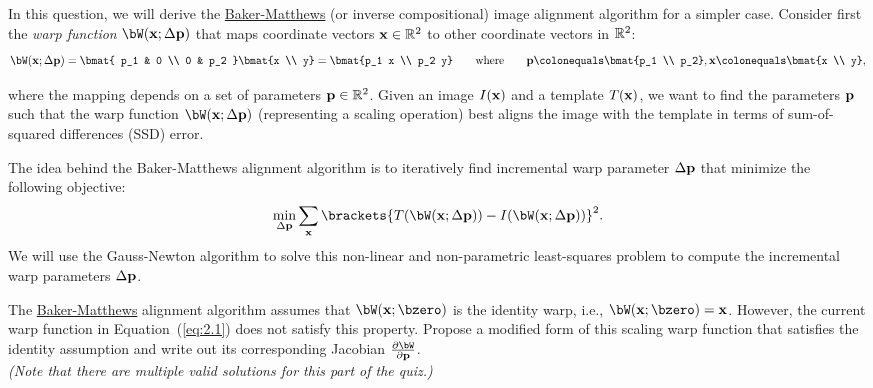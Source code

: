 \begin{problem}
  In this question, we will derive the \underline{Baker-Matthews}
  (or inverse compositional) image alignment algorithm for a simpler case.
  Consider first the \emph{warp function} $\bW(\bx; \Delta \bp)$ that maps
  coordinate vectors $\mathbf{x} \in \mathbb{R}^2$ to other coordinate vectors in $\mathbb{R}^2$:
  \begin{equation}
    \bW(\bx; \Delta \bp) =
      \bmat{ p_1 & 0 \\ 0 & p_2 }
      \bmat{x \\ y}
      = \bmat{p_1 x \\ p_2 y}
      \qquad \text{where} \qquad
      \bp \colonequals \bmat{p_1 \\ p_2},
      \bx \colonequals \bmat{x \\ y},
    \label{eq:2.1}
  \end{equation}

  where the mapping depends on a set of parameters $\mathbf{p} \in \mathbb{R}^2$.
  Given an image $I(\mathbf{x})$ and a template $T(\mathbf{x})$, we want to find the
  parameters $\mathbf{p}$ such that the warp function $\bW(\bx; \Delta \bp)$
  (representing a scaling operation) best aligns the image with the
  template in terms of sum-of-squared differences (SSD) error.

  The idea behind the Baker-Matthews alignment algorithm is to
  iteratively find incremental warp parameter $\Delta \mathbf{p}$ that
  minimize the following objective:
  \begin{equation}
    \min_{\Delta \bp} \sum_\bx \brackets{T(\bW(\bx; \Delta \bp)) - I(\bW(\bx; \Delta \bp))}^2.
    \label{eq:2.2}
  \end{equation}
  We will use the Gauss-Newton algorithm to solve this non-linear and
  non-parametric least-squares problem to compute the incremental warp
  parameters $\Delta \mathbf{p}$.

  \begin{enumroman}
    \item The \underline{Baker-Matthews} alignment algorithm assumes that
      $\bW(\bx; \bzero)$ is the identity warp, i.e., $\bW(\bx; \bzero) = \bx$.
      However, the current warp function in Equation~(\ref{eq:2.1}) does not
      satisfy this property. Propose a modified form of this scaling warp function
      that satisfies the identity assumption and write out its corresponding
      Jacobian $\frac{\partial \bW}{\partial \bp}$. \\
      \emph{(Note that there are multiple valid solutions for this part of the quiz.)}


\end{enumroman}
\end{problem}
